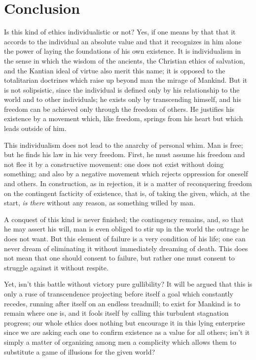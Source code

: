\documentclass[11pt]{article}
\begin{document}
{{\section*{Conclusion}
Is this kind of ethics individualistic or not? Yes, if one means by that that it accords to the individual an absolute value and that it recognizes in him alone the power of laying the foundations of his own existence. It is individualism in the sense in which the wisdom of the ancients, the Christian ethics of salvation, and the Kantian ideal of virtue also merit this name; it is opposed to the totalitarian doctrines which raise up beyond man the mirage of Mankind. But it is not solipsistic, since the individual is defined only by his relationship to the world and to other individuals; he exists only by transcending himself, and his freedom can be achieved only through the freedom of others. He justifies his existence by a movement which, like freedom, springs from his heart but which leads outside of him.

This individualism does not lead to the anarchy of personal whim. Man is free; but he finds his law in his very freedom. First, he must assume his freedom and not flee it by a constructive movement: one does not exist without doing something; and also by a negative movement which rejects oppression for oneself and others. In construction, as in rejection, it is a matter of reconquering freedom on the contingent facticity of existence, that is, of taking the given, which, at the start, \textit{is there} without any reason, as something willed by man.

A conquest of this kind is never finished; the contingency remains, and, so that he may assert his will, man is even obliged to stir up in the world the outrage he does not want. But this element of failure is a very condition of his life; one can never dream of eliminating it without immediately dreaming of death. This does not mean that one should consent to failure, but rather one must consent to struggle against it without respite.

Yet, isn’t this battle without victory pure gullibility? It will be argued that this is only a ruse of transcendence projecting before itself a goal which constantly recedes, running after itself on an endless treadmill; to exist for Mankind is to remain where one is, and it fools itself by calling this turbulent stagnation progress; our whole ethics does nothing but encourage it in this lying enterprise since we are asking each one to confirm existence as a value for all others; isn’t it simply a matter of organizing among men a complicity which allows them to substitute a game of illusions for the given world?

}}
\end{document}
